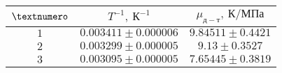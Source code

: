 \begin{tabular}{|c|c|c|}
  \hline
  $\textnumero$ & $T^{-1},\ К^{-1}$ & $\mu_{д-т},\ К/МПа$\\ \hline
  $1$ & $0.003411 \pm 0.000006$ & $9.84511 \pm 0.4421$\\ \hline
  $2$ & $0.003299 \pm 0.000005$ & $9.13 \pm 0.3527$\\ \hline
  $3$ & $0.003095 \pm 0.000005$ & $7.65445 \pm 0.3819$\\ \hline
\end{tabular}